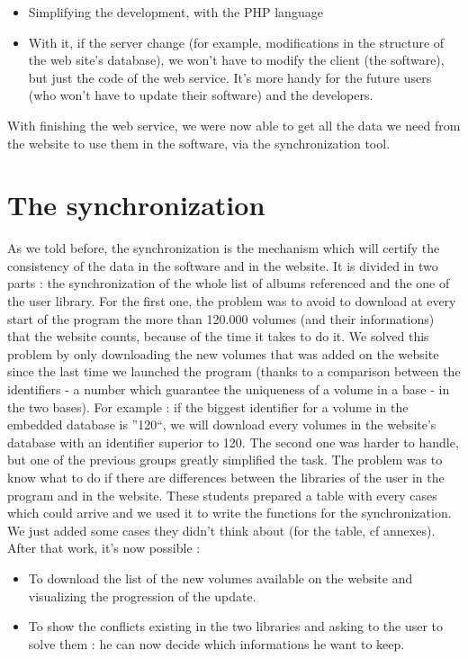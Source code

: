 \documentclass[11pt]{report} %
\begin{document}
\begin{itemize}
\item Simplifying the development, with the PHP language 
\item With it, if the server change (for example, modifications in the structure of the web site's database), we won't have to modify the client (the software), but just the code of the web service. It's more handy for the future users (who won't have to update their software) and the developers. 
\end{itemize}

With finishing the web service, we were now able to get all the data we need from the website to use them in the software, via the synchronization tool.

\section{The synchronization}
As we told before, the synchronization is the mechanism which will certify the consistency of the data in the software and in the website. It is divided in two parts : the synchronization of the whole list of albums referenced and the one of the user library.
\newline For the first one, the problem was to avoid to download at every start of the program the more than 120.000 volumes (and their informations) that the website counts, because of the time it takes to do it. We solved this problem by only downloading the new volumes that was added on the website since the last time we launched the program (thanks to a comparison between the identifiers - a number which guarantee the uniqueness of a volume in a base - in the two bases).
\newline For example : if the biggest identifier for a volume in the embedded database is ''120``, we will download every volumes in the website's database with an identifier superior to 120.
\newline The second one was harder to handle, but one of the previous groups greatly simplified the task. The problem was to know what to do if there are differences between the libraries of the user in the program and in the website. These students prepared a table with every cases which could arrive and we used it to write the functions for the synchronization. We just added some cases they didn't think about (for the table, cf annexes).
\newline After that work, it's now possible :
\begin{itemize}
\item To download the list of the new volumes available on the website and visualizing the progression of the update.
\item To show the conflicts existing in the two libraries and asking to the user to solve them : he can now decide which informations he want to keep.
\end{itemize}
\end{document}
